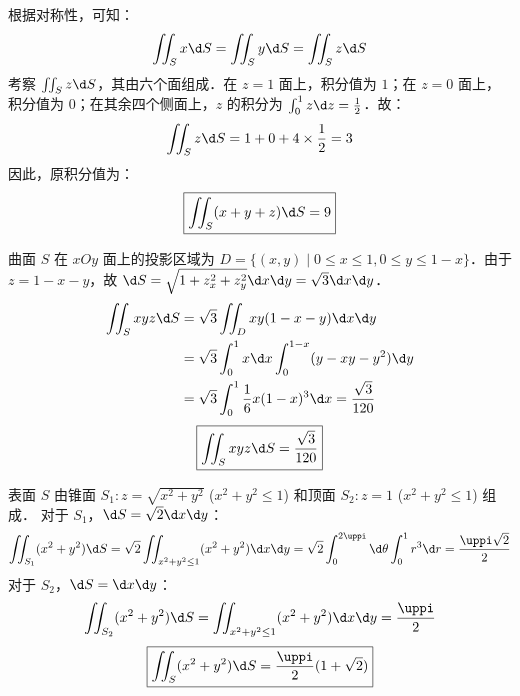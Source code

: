 \begin{solution}

    根据对称性，可知：
    \begin{equation}
        \iint_{S} x \d S = \iint_{S} y \d S = \iint_{S} z \d S
    \end{equation}
    考察 $\iint_{S} z \d S$，其由六个面组成．在 $z=1$ 面上，积分值为 $1$；在 $z=0$ 面上，积分值为 $0$；在其余四个侧面上，$z$ 的积分为 $\int_{0}^{1} z \d z = \frac{1}{2}$．故：
    \begin{equation}
        \iint_{S} z \d S = 1 + 0 + 4 \times \frac{1}{2} = 3
    \end{equation}
    因此，原积分值为：
    \begin{equation}
        \boxed{\iint_{S}(x+y+z) \d S = 9}
    \end{equation}


    曲面 $S$ 在 $xOy$ 面上的投影区域为 $D = \{(x, y) \mid 0 \le x \le 1, 0 \le y \le 1-x\}$．由于 $z = 1-x-y$，故 $\d S = \sqrt{1 + z_x^2 + z_y^2} \d x \d y = \sqrt{3} \d x \d y$．
    \begin{equation}
        \begin{aligned}
            \iint_{S} x y z \d S & = \sqrt{3} \iint_{D} x y(1-x-y) \d x \d y                                \\
                                 & = \sqrt{3} \int_{0}^{1} x \d x \int_{0}^{1-x} (y - xy - y^2) \d y        \\
                                 & = \sqrt{3} \int_{0}^{1} \frac{1}{6} x(1-x)^3 \d x = \frac{\sqrt{3}}{120}
        \end{aligned}
    \end{equation}
    \begin{equation}
        \boxed{\iint_{S} x y z \d S = \frac{\sqrt{3}}{120}}
    \end{equation}


    表面 $S$ 由锥面 $S_1: z = \sqrt{x^2+y^2}$ ($x^2+y^2 \le 1$) 和顶面 $S_2: z=1$ ($x^2+y^2 \le 1$) 组成．
    对于 $S_1$，$\d S = \sqrt{2} \d x \d y$：
    \begin{equation}
        \iint_{S_1} (x^2+y^2) \d S = \sqrt{2} \iint_{x^2+y^2 \le 1} (x^2+y^2) \d x \d y = \sqrt{2} \int_{0}^{2\uppi} \d \theta \int_{0}^{1} r^3 \d r = \frac{\uppi \sqrt{2}}{2}
    \end{equation}
    对于 $S_2$，$\d S = \d x \d y$：
    \begin{equation}
        \iint_{S_2} (x^2+y^2) \d S = \iint_{x^2+y^2 \le 1} (x^2+y^2) \d x \d y = \frac{\uppi}{2}
    \end{equation}
    \begin{equation}
        \boxed{\iint_{S} (x^2+y^2) \d S = \frac{\uppi}{2}(1+\sqrt{2})}
    \end{equation}


\end{solution}
